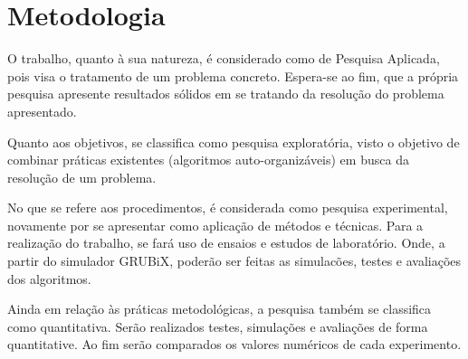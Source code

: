 \newpage\section{Metodologia}
\label{chap:Metodologia}


O trabalho, quanto à sua natureza, é considerado como de Pesquisa Aplicada, pois visa o tratamento de um problema concreto. Espera-se ao fim, que a própria pesquisa apresente resultados sólidos em se tratando da resolução do problema apresentado.

Quanto aos objetivos, se classifica como pesquisa exploratória, visto o objetivo de combinar práticas existentes (algoritmos auto-organizáveis) em busca da resolução de um problema.

No que se refere aos procedimentos, é considerada como pesquisa experimental, novamente por se apresentar como aplicação de métodos e técnicas. Para a realização do trabalho, se fará uso de ensaios e estudos de laboratório. Onde, a partir do simulador GRUBiX, poderão ser feitas as simulacões, testes e avaliações dos algoritmos.
              
Ainda em relação às práticas metodológicas, a pesquisa também se classifica como quantitativa. Serão realizados testes, simulações e avaliações de forma quantitative. Ao fim serão comparados os valores numéricos de cada experimento.
